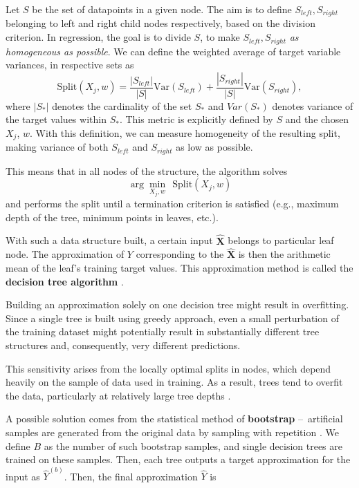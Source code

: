 Let $S$ be the set of datapoints in a given node. The aim is to define $S_{left}, S_{right}$ belonging to left and right child nodes respectively, based on the division criterion.
In regression, the goal is to divide $S$, to make $S_{left}, S_{right}$ \textit{as homogeneous as possible}. We can define the weighted average of target variable variances, in respective sets as
\begin{equation}
    \text{Split}(X_j, w) = \frac{|S_{left}|}{|S|}\text{Var}(S_{left}) + \frac{|S_{right}|}{|S|}\text{Var}(S_{right}),
\end{equation}
where $|S_{*}|$ denotes the cardinality of the set $S_{*}$ and $Var(S_{*})$ denotes variance of the target values within $S_{*}$. This metric is explicitly defined by $S$ and the chosen $X_j$, $w$.
With this definition, we can measure homogeneity of the resulting split, making variance of both $S_{left}$ and $S_{right}$ as low as possible.

This means that in all nodes of the structure, the algorithm solves
\begin{equation}
    \arg \min_{X_j, w} \>\> \text{Split}(X_j, w) 
\end{equation}
and performs the split until a termination criterion is satisfied (e.g., maximum depth of the tree, minimum points in leaves, etc.).

With such a data structure built, a certain input $\mathbf{\hat{X}}$ belongs to 
particular leaf node. The approximation of $Y$ corresponding to the $\mathbf{\hat{X}}$ is then the arithmetic mean of the leaf's training target values. This approximation method
is called the \textbf{decision tree algorithm} \cite{islp}.
\newline
\par
Building an approximation solely on one decision tree might result in overfitting. Since a single tree
is built using greedy approach, even a small perturbation of the training dataset might potentially result
in substantially different tree structures and, consequently, very different predictions.

This sensitivity arises from the locally optimal splits in nodes, which depend heavily on the sample of data used in training.
As a result, trees tend to overfit the data, particularly at relatively large tree depths \cite{islp, skiena}.

A possible solution comes from the statistical method of \textbf{bootstrap} – artificial samples are generated from the original data by sampling with repetition \cite{skiena}. 
We define $B$ as the number of such bootstrap samples, and single decision trees are trained on these samples. Then, each tree
outputs a target approximation for the input as $\hat{Y}^{(b)}$. Then, the final approximation $\hat{Y}$ is

